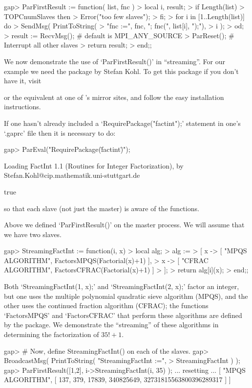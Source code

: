 \beginexample
gap> ParFirstResult := function( list, fnc )
>   local i, result;
>   if Length(list) > TOPCnumSlaves then
>     Error("too few slaves");
>   fi;
>   for i in [1..Length(list)] do
>     SendMsg( PrintToString(
>                   "fnc :=", fnc, "; fnc(", list[i], ");"),
>              i );
>   od;
>   result := RecvMsg(); # default is MPI_ANY_SOURCE
>   ParReset(); # Interrupt all other slaves
>   return result;
> end;;
\endexample

We now demonstrate the use of `ParFirstResult()'  in  ``streaming''.  For
our example we need the  package by Stefan Kohl. To  get
this package if you don't have it, visit

or the equivalent at one of {\GAP}'s mirror sites, and  follow  the  easy
installation instructions.

If one hasn't already included a  `RequirePackage("factint");'  statement
in one's `.gaprc' file then it is necessary to do:

\beginexample
gap> ParEval("RequirePackage(\"factint\")");

Loading FactInt 1.1 (Routines for Integer Factorization),
by Stefan.Kohl@cip.mathematik.uni-stuttgart.de

true
\endexample

so  that  each  slave  (not  just   the   master)   is   aware   of   the
 functions.

Above we defined `ParFirstResult()' on the master process. We will assume
that we have two slaves.

\beginexample
gap> StreamingFactInt := function(i, x)
>   local alg;
>   alg :=
>    [ x -> [ "MPQS ALGORITHM",  FactorsMPQS(Factorial(x)+1) ],
>      x -> [ "CFRAC ALGORITHM", FactorsCFRAC(Factorial(x)+1) ]
>    ];
>   return alg[i](x);
> end;;
\endexample

Both `StreamingFactInt(1, x);' and `StreamingFactInt(2,  x);'  factor  an
integer, but one uses the multiple polynomial quadratic  sieve  algorithm
(MPQS), and the other uses the continued fraction algorithm (CFRAC);  the
functions `FactorsMPQS' and `FactorsCFRAC' that perform these  algorithms
are  defined  by  the    package.  We  demonstrate   the
``streaming'' of these algorithms in  determining  the  factorization  of
$35!+1$.

\beginexample
gap> # Now, define StreamingFactInt() on each of the slaves.
gap> BroadcastMsg( PrintToString( "StreamingFactInt :=",
>                                 StreamingFactInt ) );
gap> ParFirstResult([1,2], i->StreamingFactInt(i, 35) );
... resetting ...
[ "MPQS ALGORITHM", [ 137, 379, 17839, 340825649, 32731815563800396289317 ] ]
\endexample

